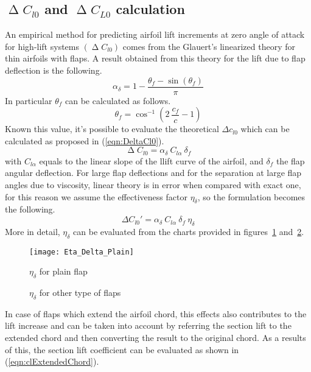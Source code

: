 \subsection{$\upDelta C_{l0}$ and  $\upDelta C_{L0}$ calculation}
An empirical method for predicting airfoil lift increments at zero angle of attack for high-lift systems $\left(\upDelta C_{l0}\right)$ comes from the Glauert’s linearized theory for thin airfoils with flaps. A result obtained from this theory for the lift due to flap deflection is the following.
%
\begin{equation}
\alpha_\delta=1-\frac{\theta_f-\sin(\theta_f)}{\pi}
\label{eqn:AlphaDelta}
\end{equation}
%
\noindent
In particular $\theta_f$ can be calculated as follows.
%
\begin{equation}
\theta_f=\cos^{-1}\left(2\ \frac{c_f}{c}-1\right)
\label{eqn:ThetaF}
\end{equation}
%
\noindent
Known this value, it's possible to evaluate the theoretical $\Delta c_{l0}$ which can be calculated as proposed in (\ref{eqn:DeltaCl0}).
%
\begin{equation}
\upDelta C_{l0}=\alpha_\delta\ C_{l\alpha}\ \delta_f
\label{eqn:DeltaCl0}
\end{equation}
%
with $C_{l\alpha}$ equals to the linear slope of the llift curve of the airfoil, and $\delta_{f}$ the flap angular deflection. For large flap deflections and for the separation at large flap angles due to viscosity, linear theory is in error when compared with exact one, for this reason we assume the effectiveness factor $\eta_\delta$, so the formulation becomes the following.
%
\begin{equation}
\Delta C_{l0}'=\alpha_\delta\ C_{l\alpha}\ \delta_f\ \eta_\delta
\label{eqn:DeltaCl0EtaDelta}
\end{equation}
%
More in detail, $\eta_\delta$ can be evaluated from the charts provided in figures~\ref{fig:EtaDeltaPlain} and~\ref{fig:EtaDelta}.
%
\begin{figure}[!t]
  \centering
  \texttt{[image: Eta\_Delta\_Plain]}
  \caption{$\eta_\delta$ for plain flap}
  \label{fig:EtaDeltaPlain}
\end{figure}
%
\begin{figure}[!b]
\centering
{}
\caption{$\eta_\delta$ for other type of flaps}
\label{fig:EtaDelta}
\end{figure}
%
\noindent
In case of flaps which extend the airfoil chord, this effects also contributes to the lift increase and can be taken into account by referring the section lift to the extended chord and then converting the result to the original chord. As a results of this, the section lift coefficient can be evaluated as shown in (\ref{eqn:clExtendedChord}).
